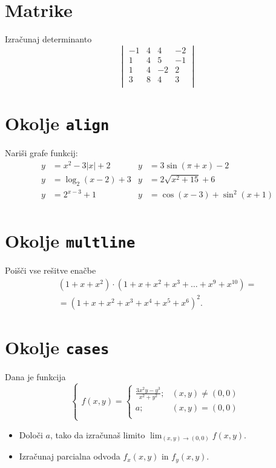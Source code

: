 \documentclass[a4paper,12pt]{article}
\begin{document}
\section*{Matrike}
Izračunaj determinanto
\[
\begin{vmatrix}
    -1 & 4 & 4 & -2 \\
    1 & 4 & 5 & -1 \\
    1 & 4 & -2 & 2 \\
    3 & 8 & 4 & 3 \\
\end{vmatrix}
\]

\section*{Okolje \texttt{align}}
Nariši grafe funkcij:
\begin{align*}
y &= x^2 - 3|x| + 2 &   y &= 3 \sin(\pi+x) - 2 \\
y &= \log_2(x-2) + 3 &  y &= 2 \sqrt{x^2+15} + 6 \\
y &= 2^{x-3} + 1   &    y &= \cos(x-3) + \sin^2(x+1) \\
\end{align*}

\section*{Okolje \texttt{multline}}
Poišči vse rešitve enačbe
\begin{multline*}
(1+x+x^2) \cdot (1+x+x^2+x^3+\ldots+x^9+x^{10}) = \\
=(1+x+x^2+x^3+x^4+x^5+x^6)^2.
\end{multline*}

\section*{Okolje \texttt{cases}}
Dana je funkcija
\[
\begin{cases}
   f(x,y) = 
   \begin{cases} 
      \frac{3x^2y-y^3}{x^2+y^2}; & (x,y) \neq (0, 0) \\
       a; & (x,y) = (0,0) \\

   \end{cases}
\end{cases}
\]
\begin{itemize}
\item Določi \(a\), tako da izračunaš limito \( \lim_{(x,y)\to(0,0)} f(x,y) \).
\item Izračunaj parcialna odvoda \(f_x(x,y)\) in \(f_y(x,y)\).
\end{itemize}
\end{document}
